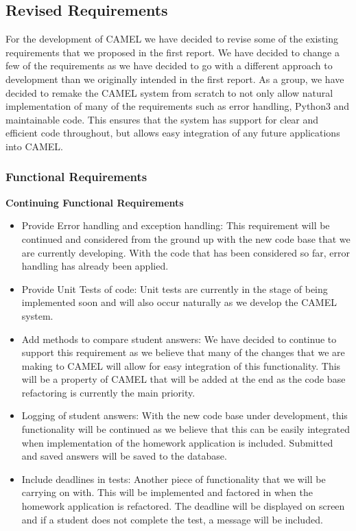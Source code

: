 \subsection{Revised Requirements}
	For the development of CAMEL we have decided to revise some of the existing requirements that we proposed in the first report. We have decided to change a few of the requirements as we have decided to go with a different approach to development than we originally intended in the first report. As a group, we have decided to remake the CAMEL system from scratch to not only allow natural implementation of many of the requirements such as error handling, Python3 and maintainable code. This ensures that the system has support for clear and efficient code throughout, but allows easy integration of any future applications into CAMEL.\\    
	
	\subsubsection{Functional Requirements}
	\textbf{Continuing Functional Requirements}
	\begin{itemize}
		\item Provide Error handling and exception handling: This requirement will be continued and considered from the ground up with the new code base that we are currently developing. With the code that has been considered so far, error handling has already been applied.  
		\item Provide Unit Tests of code: Unit tests are currently in the stage of being implemented soon and will also occur naturally as we develop the CAMEL system. 
		\item Add methods to compare student answers: We have decided to continue to support this requirement as we believe that many of the changes that we are making to CAMEL will allow for easy integration of this functionality. This will be a property of CAMEL that will be added at the end as the code base refactoring is currently the main priority.    
		\item Logging of student answers: With the new code base under development, this functionality will be continued as we believe that this can be easily integrated when implementation of the homework application is included. Submitted and saved answers will be saved to the database. 
		\item Include deadlines in tests: Another piece of functionality that we will be carrying on with. This will be implemented and factored in when the homework application is refactored. The deadline will be displayed on screen and if a student does not complete the test, a message will be included.    
	\end{itemize}
	

